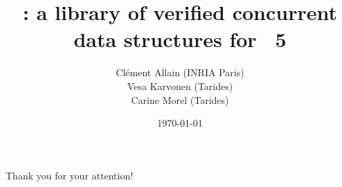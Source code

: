 \documentclass[xcolor=x11names]{beamer}
\title{\Saturn: a library of verified concurrent data structures for \OCaml~5}
\date{\today}
\author{
  Clément Allain (INRIA Paris) \\
  Vesa Karvonen (Tarides) \\
  Carine Morel (Tarides)
}
\begin{document}
\maketitle







\begin{frame}
\LARGE
\centering
Thank you for your attention!
\end{frame}
\end{document}
